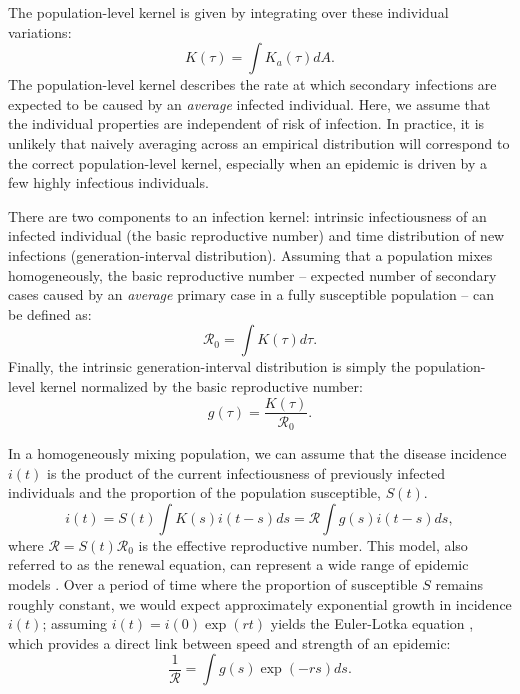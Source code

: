 \documentclass[12pt]{article}
\newcommand{\RR}{\ensuremath{{\mathcal R}}}
\begin{document}
The population-level kernel is given by integrating over these individual variations:
\begin{equation}
K(\tau) = \int K_a (\tau) dA.
\end{equation}
The population-level kernel describes the rate at which secondary infections are expected to be caused by an \emph{average} infected individual.
Here, we assume that the individual properties are independent of risk of infection.
In practice, it is unlikely that naively averaging across an empirical distribution will correspond to the correct population-level kernel, especially when an epidemic is driven by a few highly infectious individuals.

There are two components to an infection kernel: intrinsic infectiousness of an infected individual (the basic reproductive number) and time distribution of new infections (generation-interval distribution).
Assuming that a population mixes homogeneously, the basic reproductive number -- expected number of secondary cases caused by an \emph{average} primary case in a fully susceptible population -- can be defined as: 
\begin{equation}
\RR_0 = \int K(\tau) d\tau.
\end{equation}
Finally, the intrinsic generation-interval distribution is simply the population-level kernel normalized by the basic reproductive number:
\begin{equation}
g(\tau) = \frac{K(\tau)}{\RR_0}.
\end{equation}

In a homogeneously mixing population, we can assume that the disease incidence $i(t)$ is the product of the current infectiousness of previously infected individuals and the proportion of the population susceptible, $S(t)$.
\begin{equation}
i(t) = S(t) \int K(s) i(t-s) ds = \RR \int g(s) i(t-s) ds,
\end{equation}
where $\RR = S(t) \RR_0$ is the effective reproductive number.
This model, also referred to as the renewal equation, can represent a wide range of epidemic models \citep{heesterbeek1996concept, diekmann2000mathematical, roberts2004modelling, aldis2005integral, wallinga2007generation, roberts2007model}.
Over a period of time where the proportion of susceptible $S$ remains roughly constant, we would expect approximately exponential growth in incidence $i(t)$; assuming $i(t) = i(0) \exp(r t)$ yields the Euler-Lotka equation \citep{lotka1907relation}, which provides a direct link between speed and strength of an epidemic:
\begin{equation}
\frac{1}{\RR} = \int g(s) \exp(-r s) ds.
\end{equation}
\end{document}
